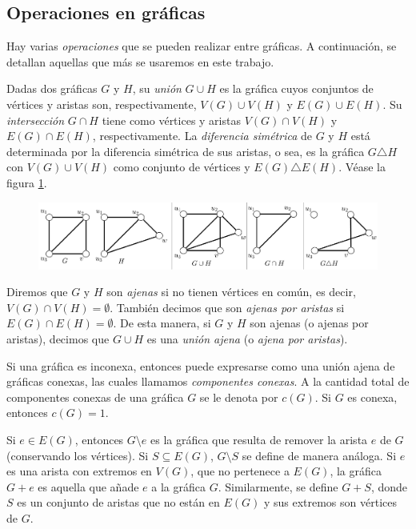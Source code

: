         \subsection{Operaciones en gráficas}
Hay varias \textit{operaciones} que se pueden realizar entre gráficas. A continuación, se detallan aquellas que más se usaremos en este trabajo.

Dadas dos gráficas $G$ y $H$, su \textit{unión} $G \cup H$ es la gráfica cuyos conjuntos de vértices y aristas son, respectivamente, $V(G) \cup V(H)$ y $E(G) \cup E(H)$. Su \textit{intersección} $G \cap H$ tiene como vértices y aristas $V(G) \cap V(H)$ y $E(G) \cap E(H)$, respectivamente. La \textit{diferencia simétrica} de $G$ y $H$ está determinada por la diferencia simétrica de sus aristas, o sea, es la gráfica $G \triangle H$ con $V(G) \cup V(H)$ como conjunto de vértices y $E(G)\triangle E(H)$. Véase la figura \ref{fig:operaciones}.

\begin{figure}[H]
    \centering
    \includegraphics[scale=0.22]{img/imgchapter1/Operaciones.jpg}
    \caption{}
    \label{fig:operaciones}
\end{figure}

Diremos que $G$ y $H$ son \textit{ajenas}  si no tienen vértices en común, es decir, $V(G)\cap V(H) = \emptyset$. También decimos que son \textit{ajenas por aristas} si $E(G)\cap E(H)=\emptyset$. De esta manera, si $G$ y $H$ son ajenas (o ajenas por aristas), decimos que $G \cup H$ es una \textit{unión ajena} (o \textit{ajena por aristas}).  

Si una gráfica es inconexa, entonces puede expresarse como una unión ajena de gráficas conexas, las cuales llamamos \textit{componentes conexas}. A la cantidad total de componentes conexas de una gráfica $G$ se le denota por $c(G)$. Si $G$ es conexa, entonces $c(G)=1$.

Si $e \in E(G)$, entonces $G\setminus e$ es la gráfica que resulta de remover la arista $e$ de $G$ (conservando los vértices). Si $S\subseteq E(G)$, $G\setminus S$ se define de manera análoga. Si $e$ es una arista con extremos en $V(G)$, que no pertenece a $E(G)$, la gráfica $G+e$ es aquella que añade $e$ a la gráfica $G$. Similarmente, se define $G + S$, donde $S$ es un conjunto de aristas que no están en $E(G)$ y sus extremos son vértices de $G$.



